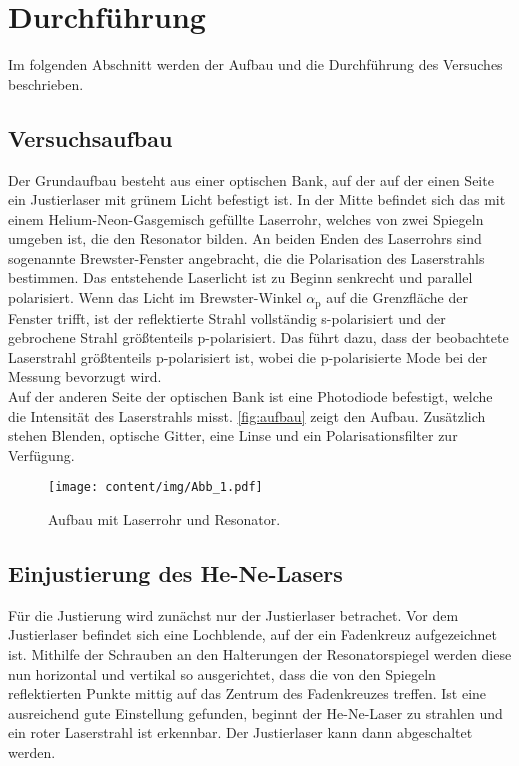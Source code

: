 \section{Durchführung}
\label{sec:durchfuehrung}

    Im folgenden Abschnitt werden der Aufbau und die Durchführung des Versuches beschrieben.

\subsection{Versuchsaufbau}
\label{sec:versuchsaufbau}

    Der Grundaufbau besteht aus einer optischen Bank,
    auf der auf der einen Seite ein Justierlaser mit grünem Licht befestigt ist.
    In der Mitte befindet sich das mit einem Helium-Neon-Gasgemisch gefüllte Laserrohr,
    welches von zwei Spiegeln umgeben ist,
    die den Resonator bilden.
    An beiden Enden des Laserrohrs sind sogenannte Brewster-Fenster angebracht,
    die die Polarisation des Laserstrahls bestimmen.
    Das entstehende Laserlicht ist zu Beginn senkrecht und parallel polarisiert.
    Wenn das Licht im Brewster-Winkel $\alpha_\text{p}$ auf die Grenzfläche der Fenster trifft,
    ist der reflektierte Strahl vollständig s-polarisiert und der gebrochene Strahl größtenteils p-polarisiert.
    Das führt dazu,
    dass der beobachtete Laserstrahl größtenteils p-polarisiert ist,
    wobei die p-polarisierte Mode bei der Messung bevorzugt wird.\\
    Auf der anderen Seite der optischen Bank ist eine Photodiode befestigt,
    welche die Intensität des Laserstrahls misst.
    \autoref{fig:aufbau} zeigt den Aufbau.
    Zusätzlich stehen Blenden, optische Gitter, eine Linse und ein Polarisationsfilter zur Verfügung.

    \begin{figure}
      \centering
      \texttt{[image: content/img/Abb\_1.pdf]}
      \caption{Aufbau mit Laserrohr und Resonator. \cite{versuchsanleitung}}
      \label{fig:aufbau}
    \end{figure}


\subsection{Einjustierung des He-Ne-Lasers}

    Für die Justierung wird zunächst nur der Justierlaser betrachet.
    Vor dem Justierlaser befindet sich eine Lochblende,
    auf der ein Fadenkreuz aufgezeichnet ist.
    Mithilfe der Schrauben an den Halterungen der Resonatorspiegel werden diese nun horizontal und vertikal so ausgerichtet,
    dass die von den Spiegeln reflektierten Punkte mittig auf das Zentrum des Fadenkreuzes treffen.
    Ist eine ausreichend gute Einstellung gefunden,
    beginnt der He-Ne-Laser zu strahlen
    und ein roter Laserstrahl ist erkennbar.
    Der Justierlaser kann dann abgeschaltet werden.


